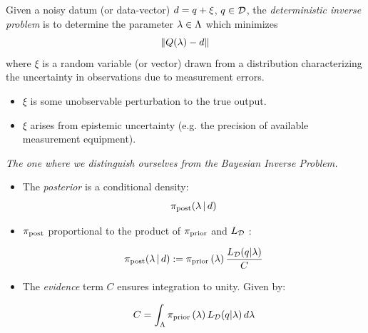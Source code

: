 \begin{frame}
\begin{defn}
  Given a noisy datum (or data-vector) $d = q + \xi$, $q \in \mathcal{D}$, the \emph{deterministic inverse problem} is to determine the parameter $\lambda \in {\Lambda}$ which minimizes
  \begin{equation}
    \left\Vert Q(\lambda) - d\right\Vert
  \end{equation}
  where $\xi$ is a random variable (or vector) drawn from a distribution characterizing the uncertainty in observations due to measurement errors.
\end{defn}

\begin{itemize}
	\item $\xi$ is some unobservable perturbation to the true output.
	\item $\xi$ arises from epistemic uncertainty (e.g. the precision of available measurement equipment).
\end{itemize}

\end{frame}


\begin{frame}{\it The one where we distinguish ourselves from the Bayesian Inverse Problem.}

\begin{itemize}
	\item The \emph{posterior} is a conditional density: $$\operatorname*{\pi_{post}}(\lambda\, | \, d)$$

	\bigskip
	\item $\operatorname*{\pi_{post}}$ proportional to the product of $\operatorname*{\pi_{prior}}$ and $L_{\mathcal{D}}$ \cite{Walpole, Berger, Complete, Smith}:

\begin{equation}\label{eq:sb_post}
    \operatorname*{\pi_{post}}(\lambda\, | \, d) := \operatorname*{\pi_{prior}}\left ( \lambda \right ) \frac{L_{\mathcal{D}} (q | \lambda)}{ C }
\end{equation}

	\bigskip
	\item The \emph{evidence} term $C$ ensures integration to unity. Given by:

$$C = \int_{\Lambda} \operatorname*{\pi_{prior}}\left ( \lambda \right ) L_{\mathcal{D}}(q | \lambda) \, d\lambda$$

\end{itemize}

\end{frame}

